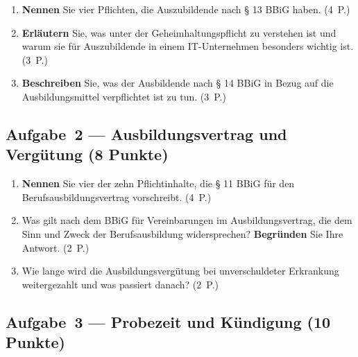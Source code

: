\documentclass[11pt, a4paper]{article}
\begin{document}
\begin{enumerate}[label=(\alph*)]
  \item \textbf{Nennen} Sie vier Pflichten, die Auszubildende nach § 13 BBiG haben. \hfill (4~P.)

  \vspace{3cm}

  \item \textbf{Erläutern} Sie, was unter der Geheimhaltungspflicht zu verstehen ist und warum sie für Auszubildende in einem IT-Unternehmen besonders wichtig ist. \hfill (3~P.)

  \vspace{3cm}

  \item \textbf{Beschreiben} Sie, was der Ausbildende nach § 14 BBiG in Bezug auf die Ausbildungsmittel verpflichtet ist zu tun. \hfill (3~P.)

  \vspace{3cm}
\end{enumerate}

\subsection*{Aufgabe~2 --- Ausbildungsvertrag und Vergütung (8 Punkte)}

\begin{enumerate}[label=(\alph*)]
  \item \textbf{Nennen} Sie vier der zehn Pflichtinhalte, die § 11 BBiG für den Berufsausbildungsvertrag vorschreibt. \hfill (4~P.)

  \vspace{3cm}

  \item Was gilt nach dem BBiG für Vereinbarungen im Ausbildungsvertrag, die dem Sinn und Zweck der Berufsausbildung widersprechen? \textbf{Begründen} Sie Ihre Antwort. \hfill (2~P.)

  \vspace{2.5cm}

  \item Wie lange wird die Ausbildungsvergütung bei unverschuldeter Erkrankung weitergezahlt und was passiert danach? \hfill (2~P.)

  \vspace{2.5cm}
\end{enumerate}

\subsection*{Aufgabe~3 --- Probezeit und Kündigung (10 Punkte)}
\end{document}
